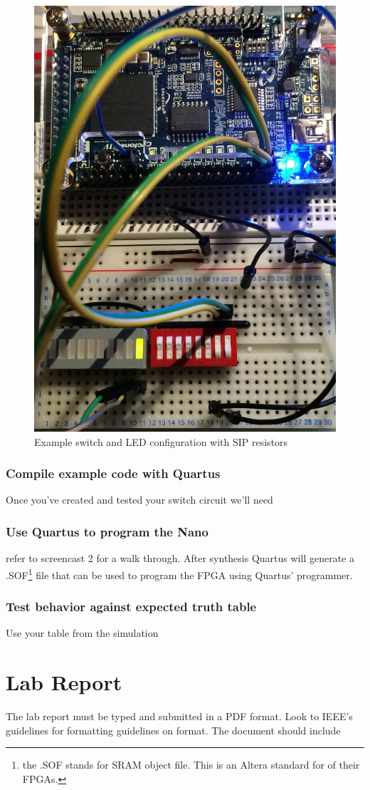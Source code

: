 \documentclass[12pt,journal]{IEEEtran}
\begin{document}
      \begin{figure}[H]
        \includegraphics[width=.48\textwidth]{Images/ExampleLayout.jpg}
        \caption{Example switch and LED configuration with SIP resistors}
      \end{figure}

      \subsubsection{Compile example code with Quartus}
        Once you've created and tested your switch circuit we'll need  

      \subsubsection{Use Quartus to program the Nano} refer to screencast 2 for a walk through. After synthesis
      Quartus will generate a .SOF\footnote{the .SOF stands for SRAM object file. This is an Altera standard for
      of their FPGAs.} file that can be used to program the FPGA using Quartus' programmer.
        
      \subsubsection{Test behavior against expected truth table} Use your table from the simulation 

  \section{\bfseries  Lab Report}
    The lab report must be typed and submitted in a PDF format. Look to IEEE's guidelines for formatting guidelines
    on format. The document should include
\end{document}
